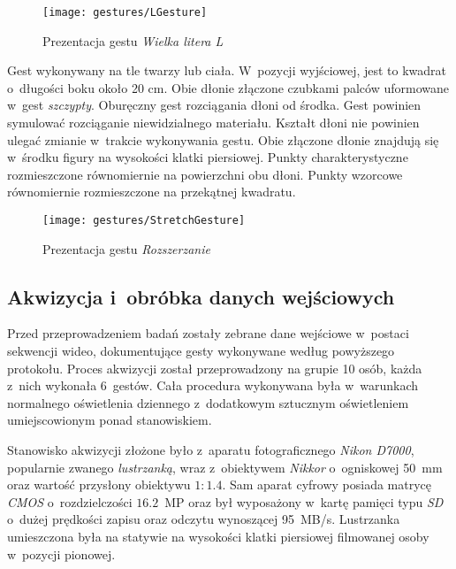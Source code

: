         \begin{figure}[!ht]
          \centering
          \texttt{[image: gestures/LGesture]}
          \caption[Prezentacja gestu Wielka litera L]
                  {Prezentacja gestu \textit{Wielka litera L}}
          \label{fig:LGesture}
        \end{figure}

      \newpage
             {Gest wykonywany na tle twarzy lub ciała.}
             {W~pozycji wyjściowej, jest to kwadrat o~długości boku około 20 cm.}
             {Obie dłonie złączone czubkami palców uformowane w~gest \textit{szczypty}.}
             {Oburęczny gest rozciągania dłoni od środka.}
             {Gest powinien symulować rozciąganie niewidzialnego materiału. Kształt dłoni nie powinien ulegać zmianie w~trakcie wykonywania gestu.}
             {Obie złączone dłonie znajdują się w~środku figury na wysokości klatki piersiowej.}
             {Punkty charakterystyczne rozmieszczone równomiernie na powierzchni obu dłoni.}
             {Punkty wzorcowe równomiernie rozmieszczone na przekątnej kwadratu.}

        \begin{figure}[!ht]
          \centering
          \texttt{[image: gestures/StretchGesture]}
          \caption[Prezentacja gestu Rozszerzanie]
                  {Prezentacja gestu \textit{Rozszerzanie}}
          \label{fig:StretchGesture}
        \end{figure}

    \subsection{Akwizycja i~obróbka danych wejściowych}\label{Subsection_Akwizycja}

      Przed przeprowadzeniem badań zostały zebrane dane wejściowe w~postaci sekwencji wideo, dokumentujące gesty wykonywane według powyższego protokołu. Proces akwizycji został przeprowadzony na grupie 10 osób, każda z~nich wykonała 6~gestów. Cała procedura wykonywana była w~warunkach normalnego oświetlenia dziennego z~dodatkowym sztucznym oświetleniem umiejscowionym ponad stanowiskiem.

      Stanowisko akwizycji złożone było z~aparatu fotograficznego \textit{Nikon D7000}, popularnie zwanego \textit{lustrzanką}, wraz z~obiektywem \textit{Nikkor} o~ogniskowej 50~mm oraz wartość przysłony obiektywu $1:1.4$. Sam aparat cyfrowy posiada matrycę \textit{CMOS} o~rozdzielczości $16.2$~MP oraz był wyposażony w~kartę pamięci typu \textit{SD} o~dużej prędkości zapisu oraz odczytu wynoszącej 95~MB/s. Lustrzanka umieszczona była na statywie na wysokości klatki piersiowej filmowanej osoby w~pozycji pionowej.

